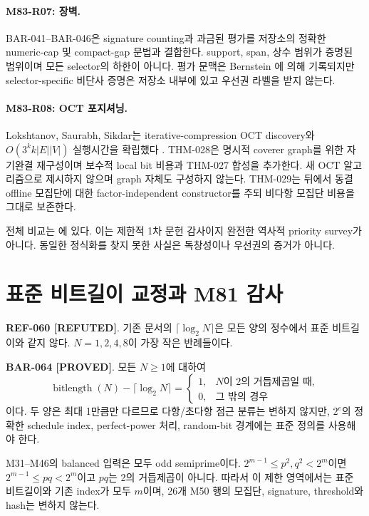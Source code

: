 \documentclass[11pt]{article}
\newcommand{\claimstatus}[2]{\textbf{#1 [#2]}}
\begin{document}
\paragraph{M83-R07: 장벽.}
BAR-041--BAR-046은 signature counting과 과금된 평가를 저장소의 정확한
numeric-cap 및 compact-gap 문법과 결합한다. support, span, 상수 범위가
증명된 범위이며 모든 selector의 하한이 아니다. 평가 문맥은 Bernstein
\cite{bernstein2004smoothparts}에 의해 기록되지만 selector-specific
비단사 증명은 저장소 내부에 있고 우선권 라벨을 받지 않는다.

\paragraph{M83-R08: OCT 포지셔닝.}
Lokshtanov, Saurabh, Sikdar는 iterative-compression OCT discovery와
\(O(3^k k|E||V|)\) 실행시간을 확립했다
\cite{lokshtanov2009oct}. THM-028은 명시적 coverer graph를 위한
자기완결 재구성이며 보수적 local bit 비용과 THM-027 합성을 추가한다.
새 OCT 알고리즘으로 제시하지 않으며 graph 자체도 구성하지 않는다.
THM-029는 뒤에서 동결 offline 모집단에 대한 factor-independent
constructor를 주되 비다항 모집단 비용을 그대로 보존한다.

전체 비교는
에 있다. 이는
제한적 1차 문헌 감사이지 완전한 역사적 priority survey가 아니다.
동일한 정식화를 찾지 못한 사실은 독창성이나 우선권의 증거가 아니다.

\section{표준 비트길이 교정과 M81 감사}

\claimstatus{REF-060}{REFUTED}. 기존 문서의
\(\lceil\log_2N\rceil\)은 모든 양의 정수에서 표준 비트길이와 같지
않다. \(N=1,2,4,8\)이 가장 작은 반례들이다.

\claimstatus{BAR-064}{PROVED}. 모든 \(N\ge1\)에 대하여
\[
\operatorname{bitlength}(N)-\lceil\log_2N\rceil
=
\begin{cases}
1,&N\text{이 2의 거듭제곱일 때},\\
0,&\text{그 밖의 경우}
\end{cases}
\]
이다. 두 양은 최대 1만큼만 다르므로 다항/초다항 점근 분류는
변하지 않지만, \(2^e\)의 정확한 schedule index, perfect-power 처리,
random-bit 경계에는 표준 정의를 사용해야 한다.

M31--M46의 balanced 입력은 모두 odd semiprime이다.
\(2^{m-1}\le p^2,q^2<2^m\)이면
\(2^{m-1}\le pq<2^m\)이고 \(pq\)는 2의 거듭제곱이 아니다.
따라서 이 제한 영역에서는 표준 비트길이와 기존 index가 모두
\(m\)이며, 26개 M50 행의 모집단, signature, threshold와 hash는
변하지 않는다.
\end{document}
